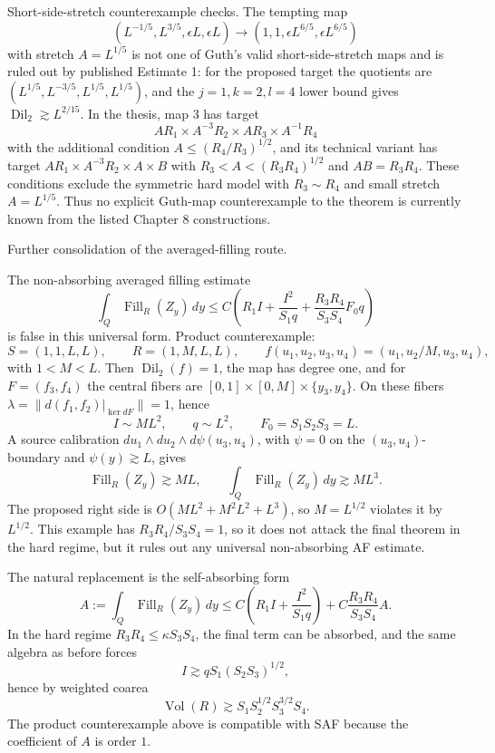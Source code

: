 \documentclass[12pt]{article}
\newcommand{\Dil}{\operatorname{Dil}}
\newcommand{\Vol}{\operatorname{Vol}}
\newcommand{\Fill}{\operatorname{Fill}}
\begin{document}
Short-side-stretch counterexample checks.  The tempting map
\[
(L^{-1/5},L^{3/5},\epsilon L,\epsilon L)\to
(1,1,\epsilon L^{6/5},\epsilon L^{6/5})
\]
with stretch \(A=L^{1/5}\) is not one of Guth's valid short-side-stretch maps and is
ruled out by published Estimate 1: for the proposed target the quotients are
\((L^{1/5},L^{-3/5},L^{1/5},L^{1/5})\), and the \(j=1,k=2,l=4\) lower bound gives
\(\Dil_2\gtrsim L^{2/15}\).  In the thesis, map 3 has target
\[
AR_1\times A^{-3}R_2\times AR_3\times A^{-1}R_4
\]
with the additional condition \(A\le (R_4/R_3)^{1/2}\), and its technical variant
has target \(AR_1\times A^{-3}R_2\times A\times B\) with
\(R_3<A<(R_3R_4)^{1/2}\) and \(AB=R_3R_4\).  These conditions exclude the symmetric
hard model with \(R_3\sim R_4\) and small stretch \(A=L^{1/5}\).  Thus no explicit
Guth-map counterexample to the theorem is currently known from the listed
Chapter 8 constructions.




Further consolidation of the averaged-filling route.

The non-absorbing averaged filling estimate
\[
\int_Q\Fill_R(Z_y)\,dy
\le C\left(R_1I+\frac{I^2}{S_1q}
+\frac{R_3R_4}{S_3S_4}F_0q\right)
\]
is false in this universal form.  Product counterexample:
\[
S=(1,1,L,L),\qquad R=(1,M,L,L),\qquad
f(u_1,u_2,u_3,u_4)=(u_1,u_2/M,u_3,u_4),
\]
with \(1<M<L\).  Then \(\Dil_2(f)=1\), the map has degree one, and for
\(F=(f_3,f_4)\) the central fibers are
\([0,1]\times[0,M]\times\{y_3,y_4\}\).  On these fibers
\(\lambda=\|d(f_1,f_2)|_{\ker dF}\|=1\), hence
\[
I\sim ML^2,\qquad q\sim L^2,\qquad F_0=S_1S_2S_3=L.
\]
A source calibration \(du_1\wedge du_2\wedge d\psi(u_3,u_4)\), with
\(\psi=0\) on the \((u_3,u_4)\)-boundary and \(\psi(y)\gtrsim L\), gives
\[
\Fill_R(Z_y)\gtrsim ML,\qquad \int_Q\Fill_R(Z_y)\,dy\gtrsim ML^3.
\]
The proposed right side is \(O(ML^2+M^2L^2+L^3)\), so \(M=L^{1/2}\) violates it
by \(L^{1/2}\).  This example has \(R_3R_4/S_3S_4=1\), so it does not attack the
final theorem in the hard regime, but it rules out any universal non-absorbing
AF estimate.

The natural replacement is the self-absorbing form
\[
A:=\int_Q\Fill_R(Z_y)\,dy
\le C\left(R_1I+\frac{I^2}{S_1q}\right)
 + C\frac{R_3R_4}{S_3S_4}A . \tag{SAF}
\]
In the hard regime \(R_3R_4\le \kappa S_3S_4\), the final term can be absorbed,
and the same algebra as before forces
\[
I\gtrsim qS_1(S_2S_3)^{1/2},
\]
hence by weighted coarea
\[
\Vol(R)\gtrsim S_1S_2^{1/2}S_3^{3/2}S_4.
\]
The product counterexample above is compatible with SAF because the coefficient
of \(A\) is order \(1\).
\end{document}
